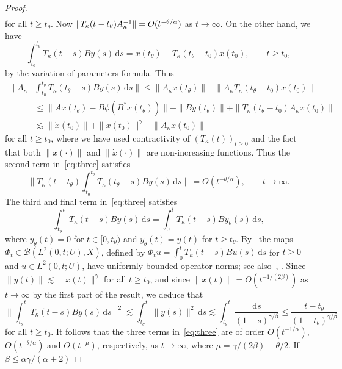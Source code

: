 \documentclass[11pt, a4paper]{amsart}
\newcommand{\dd}{\mathrm{d}}
\newcommand{\B}{\mathcal{B}}
\newcommand{\inv}{^{-1}}
\theoremstyle{definition}
\numberwithin{equation}{section}
\begin{document}
\begin{proof}
$$\begin{aligned}
\end{aligned}$$
 for all $t\ge t_\theta$. Now $\|T_\kappa (t-t_\theta)\smash{A_\kappa\inv}\|=O(t^{-\theta/\alpha})$ as $t\to\infty$. On the other hand,  we have 
$$ \int_{t_0}^{t_\theta} T_\kappa (t-s)By(s)\,\dd s = x(t_\theta)-T_\kappa (t_\theta-t_0)x(t_0),\qquad t\ge t_0,$$ 
by the variation of parameters formula. Thus 
$$\begin{aligned}
\bigg\|A_\kappa&\int_{t_0}^{t_\theta} T_\kappa (t_\theta-s)By(s)\,\dd s\bigg\|\le \|A_\kappa x(t_\theta)\|+\|A_\kappa T_\kappa (t_\theta-t_0)x(t_0)\|\\
&\le  \|Ax(t_\theta) - B\phi(B^\ast x(t_\theta))\|+\|By(t_\theta)\|+\|T_\kappa (t_\theta-t_0)A_\kappa x(t_0)\|\\
&\lesssim \|\dot{x}(t_0)\|+\|x(t_0)\|^\gamma+\|A_\kappa x(t_0)\|
\end{aligned}$$
for all $t\ge t_0$, where we have used contractivity of $(T_\kappa(t))_{t\ge0}$ and the fact that both $\|x(\cdot)\|$ and $\|\dot x(\cdot)\|$ are non-increasing functions. Thus the second term in~\eqref{eq:three} satisfies
$$\bigg\|T_\kappa (t-t_\theta)\int_{t_0}^{t_\theta} T_\kappa (t_\theta-s)By(s)\,\dd s\bigg\|=O({t^{-\theta/\alpha}}),\qquad t\to\infty.$$
The third and final term in~\eqref{eq:three} satisfies
$$ \int_{t_\theta}^t T_\kappa (t-s)By(s)\,\dd s
= \int_{0}^t T_\kappa (t-s)By_\theta(s)\,\dd s,$$
where $y_\theta(t)=0$ for $t\in[0,t_\theta)$ and $y_\theta(t)=y(t)$ for $t\ge t_\theta$. By~\cite[Lem.~2.2.6]{Oos00book} the maps $\Phi_t\in\B(L^2(0,t;U),X)$, defined by $\Phi_t u=\int_0^t T_\kappa (t-s)Bu(s)\,\dd s$ for $t\ge 0$ and $u\in L^2(0,t;U)$, have uniformly bounded operator norms; see also~\cite[Thm.~6.5.6]{CurZwa20book}, \cite[Cor.~6.1]{Sta02}. Since $\|y(t)\|\lesssim \|x(t)\|^\gamma$ for all $t\ge t_0$, and since $\|x(t)\|=O(t^{-1/(2\beta)})$ as $t\to\infty$ by the first part of the result, we deduce that
$$\bigg\| \int_{t_\theta}^t T_\kappa (t-s)By(s)\,\dd s\bigg\|^2\lesssim  \int_{t_\theta}^t \|y(s)\|^2\,\dd s\lesssim\int_{t_\theta}^t\frac{\dd s}{(1+s)^{\gamma/\beta}}\le\frac{t-t_\theta}{(1+t_\theta)^{\gamma/\beta}}$$
for all $t\ge t_0$.
It follows that the three terms in~\eqref{eq:three} are of order
$O(t^{-1/\alpha})$, $O(t^{-\theta/\alpha})$ and  $O(t^{-\mu})$, respectively, as $t\to\infty$, where  $\mu=\gamma/(2\beta)-\theta/2$. If  $\beta\le \alpha\gamma/(\alpha+2)$

\end{proof}
\end{document}
